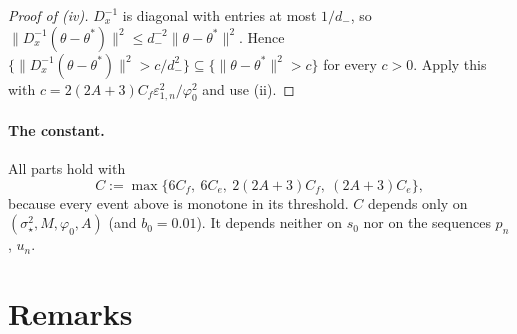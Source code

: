 \documentclass[11pt]{article}
\theoremstyle{remark}
\newcommand{\ve}{\varepsilon}
\newcommand{\sst}{\sigma_\star}
\begin{document}
\begin{proof}[Proof of (iv)]
$D_x^{-1}$ is diagonal with entries at most $1/d_-$, so $\|D_x^{-1}(\theta-\theta^\ast)\|^2\le d_-^{-2}\|\theta-\theta^\ast\|^2$. Hence $\{\|D_x^{-1}(\theta-\theta^\ast)\|^2>c/d_-^2\}\subseteq\{\|\theta-\theta^\ast\|^2>c\}$ for every $c>0$. Apply this with $c=2(2A+3)C_f\ve_{1,n}^2/\varphi_0^2$ and use (ii).
\end{proof}

\paragraph{The constant.} All parts hold with
\begin{equation}\label{eq:Cfinal}
C:=\max\big\{6C_f,\ 6C_e,\ 2(2A+3)C_f,\ (2A+3)C_e\big\},
\end{equation}
because every event above is monotone in its threshold. $C$ depends only on $(\sst^2,M,\varphi_0,A)$ (and $b_0=0.01$). It depends neither on $s_0$ nor on the sequences $p_n$, $u_n$.

\section{Remarks}\label{sec:remarks}
\end{document}
